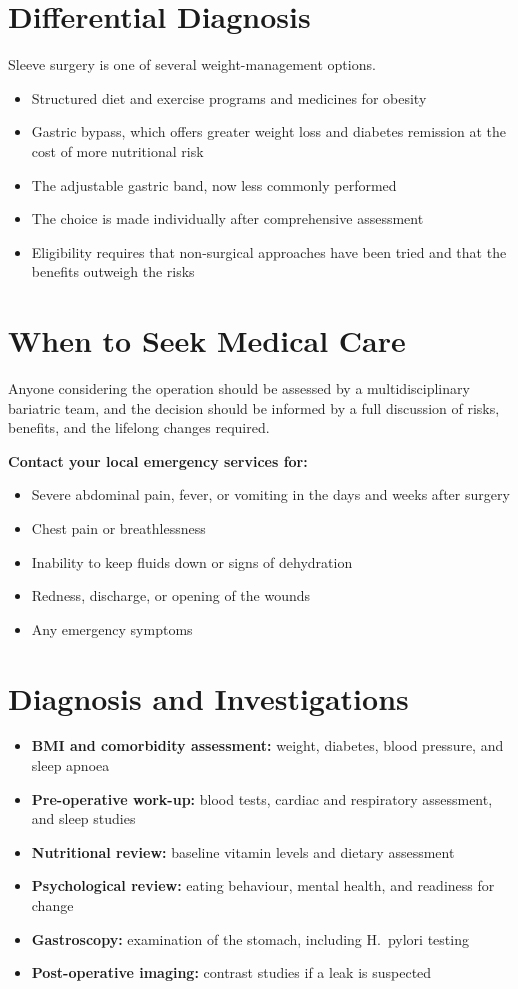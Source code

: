 \section*{Differential Diagnosis}
Sleeve surgery is one of several weight-management options.
\begin{itemize}
    \item Structured diet and exercise programs and medicines for obesity
    \item Gastric bypass, which offers greater weight loss and diabetes remission at the cost of more nutritional risk
    \item The adjustable gastric band, now less commonly performed
    \item The choice is made individually after comprehensive assessment
    \item Eligibility requires that non-surgical approaches have been tried and that the benefits outweigh the risks
\end{itemize}

\section*{When to Seek Medical Care}
Anyone considering the operation should be assessed by a multidisciplinary bariatric team, and the decision should be informed by a full discussion of risks, benefits, and the lifelong changes required.

\textbf{Contact your local emergency services for:}
\begin{itemize}
    \item Severe abdominal pain, fever, or vomiting in the days and weeks after surgery
    \item Chest pain or breathlessness
    \item Inability to keep fluids down or signs of dehydration
    \item Redness, discharge, or opening of the wounds
    \item Any emergency symptoms
\end{itemize}

\section*{Diagnosis and Investigations}
\begin{itemize}
    \item \textbf{BMI and comorbidity assessment:} weight, diabetes, blood pressure, and sleep apnoea
    \item \textbf{Pre-operative work-up:} blood tests, cardiac and respiratory assessment, and sleep studies
    \item \textbf{Nutritional review:} baseline vitamin levels and dietary assessment
    \item \textbf{Psychological review:} eating behaviour, mental health, and readiness for change
    \item \textbf{Gastroscopy:} examination of the stomach, including H.\ pylori testing
    \item \textbf{Post-operative imaging:} contrast studies if a leak is suspected
\end{itemize}

